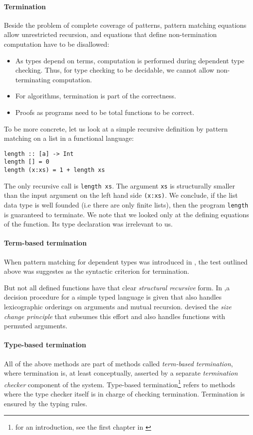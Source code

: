 \paragraph*{Termination}
Beside the problem of complete coverage of patterns, pattern matching equations allow unrestricted recursion, and equations that define non-termination computation have to be disallowed: 
\begin{itemize}
\item
As types depend on terms, computation is performed during dependent type checking.
Thus, for type checking to be decidable, we cannot allow non-terminating computation. 
\item
For algorithms, termination is part of the correctness.
\item
Proofs as programs need to be total functions to be correct.
\end{itemize}
To be more concrete, let us look at a simple recursive definition by pattern matching on a list in a functional language: 
\begin{verbatim}
length :: [a] -> Int
length [] = 0
length (x:xs) = 1 + length xs 
\end{verbatim}
The only recursive call is \texttt{length xs}.
The argument \texttt{xs} is structurally smaller than the input argument on the left hand side \texttt{(x:xs)}.
We conclude, if the list data type is well founded (i.e there are only finite lists), then the program \texttt{length} is guaranteed to terminate.
We note that we looked only at the defining equations of the function. Its type declaration was irrelevant to us.
\paragraph*{Term-based termination}
When pattern matching for dependent types was introduced in  \cite{coquand92pattern},
the test outlined above was suggestes as the syntactic criterion for termination. 

But not all defined functions have that clear \emph{structural recursive} form.
In \cite{abelAltenkirch:predStRec},a decision procedure for a simple typed language is given that also handles lexicographic orderings on arguments and mutual recursion.
\cite{lee01sizechange} devised the \emph{size change principle} that subsumes this effort and also handles functions with permuted arguments. 
\paragraph*{Type-based termination}
All of the above methods are part of methods called \emph{term-based termination}, where termination is, at least conceptually,  asserted by a separate \emph{termination checker} component of the system. 
Type-based termination\footnote{for an introduction, see the first chapter in \cite{abel:PhD}} refers to methods where the type checker itself is in charge of checking termination. Termination is ensured by the typing rules. 


